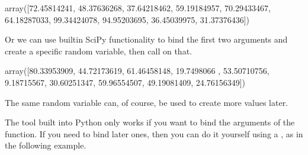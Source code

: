 \documentclass[letterpaper,10pt,english]{sphinxmanual}
\begin{document}
\begin{sphinxVerbatim}[commandchars=\\\{\}]
   
    
\end{sphinxVerbatim}

\begin{sphinxVerbatim}[commandchars=\\\{\}]
array([72.45814241, 48.37636268, 37.64218462, 59.19184957, 70.29433467,
       64.18287033, 99.34424078, 94.95203695, 36.45039975, 31.37376436])
\end{sphinxVerbatim}

Or we can use built\sphinxhyphen{}in SciPy functionality to bind the first two arguments and create a specific random variable, then call  on that.

\begin{sphinxVerbatim}[commandchars=\\\{\}]
       
               
\end{sphinxVerbatim}

\begin{sphinxVerbatim}[commandchars=\\\{\}]
array([80.33953909, 44.72173619, 61.46458148, 19.7498066 , 53.50710756,
        9.18715567, 30.60251347, 59.96554507, 49.19081409, 24.76156349])
\end{sphinxVerbatim}

The same random variable can, of course, be used to create more values later.

The  tool built into Python only works if you want to bind the  arguments of the function.  If you need to bind later ones, then you can do it yourself using a , as in the following example.

\begin{sphinxVerbatim}[commandchars=\\\{\}]
        
       

         

  
\end{sphinxVerbatim}
\end{document}
